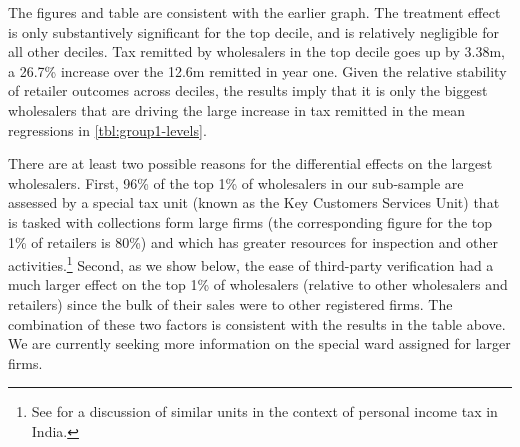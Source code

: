 The figures and table are consistent with the earlier graph. The treatment effect is only substantively significant for the top decile, and is relatively negligible for all other deciles. Tax remitted by wholesalers in the top decile goes up by \rupee 3.38m, a 26.7\% increase over the \rupee 12.6m remitted in year one. Given the relative stability of retailer outcomes across deciles, the results imply that it is only the biggest wholesalers that are driving the large increase in tax remitted in the mean regressions in \cref{tbl:group1-levels}.

There are at least two possible reasons for the differential effects on the largest wholesalers. First, 96\% of the top 1\% of wholesalers in our sub-sample are assessed by a special tax unit (known as the Key Customers Services Unit) that is tasked with collections form large firms (the corresponding figure for the top 1\% of retailers is 80\%) and which has greater resources for inspection and other activities.\footnote{See \cite{DasGuptaetal:2004} for a discussion of similar units in the context of personal income tax in India.} Second, as we show below, the ease of third-party verification had a much larger effect on the top 1\% of wholesalers (relative to other wholesalers and retailers) since the bulk of their sales were to other registered firms. The combination of these two factors is consistent with the results in the table above. We are currently seeking more information on the special ward assigned for larger firms.


